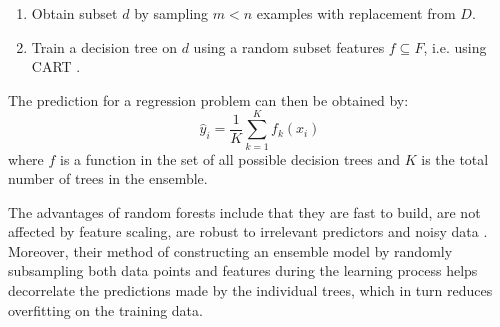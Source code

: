 \documentclass[preprint,1p, times,authoryear]{elsarticle}
\begin{document}
\begin{enumerate}[noitemsep]
    \item Obtain subset $d$ by sampling $m<n$ examples with replacement from $D$.
    \item Train a decision tree on $d$ using a random subset features $f \subseteq F$, i.e. using CART \citep{cart}.
\end{enumerate}
The prediction for a regression problem can then be obtained by:
\begin{equation}
     \hat{y}_{i} = \frac{1}{K} \sum_{k=1}^{K} f_{k}(x_{i})
    \label{rf1}
\end{equation}
where $f$ is a function in the set of all possible decision trees and $K$ is the total number of trees in the ensemble.

The advantages of random forests include that they are fast to build, are not affected by feature scaling,  are robust to irrelevant predictors and noisy data \citep{noisebag}. Moreover, their method of constructing an ensemble model by randomly subsampling both data points and features during the learning process helps decorrelate the predictions made by the individual trees, which in turn reduces overfitting on the training data. 





\end{document}

